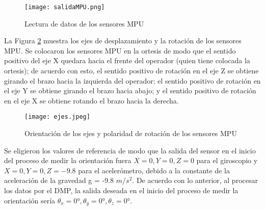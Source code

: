 \begin{figure}[htb]
	\centering
	\texttt{[image: salidaMPU.png]}
	\caption{Lectura de datos de los sensores MPU}
	\label{fig:salidaMPU}
\end{figure}



\newpage
La Figura \ref{fig:ejes} muestra los ejes de desplazamiento y la rotación de los sensores MPU. Se colocaron los sensores MPU en la ortesis de modo que el sentido positivo del eje X quedara hacia el frente del operador (quien tiene colocada la ortesis); de acuerdo con esto, el sentido positivo de rotación en el eje Z se obtiene girando el brazo hacia la izquierda del operador; el sentido positivo de rotación en el eje Y se obtiene girando el brazo hacia abajo; y el sentido positivo de rotación en el eje X se obtiene rotando el brazo hacia la derecha.

\begin{figure}[htb]
	\centering
	\texttt{[image: ejes.jpeg]}
	\caption{Orientación de los ejes y polaridad de rotación de los sensores MPU}
	\label{fig:ejes}
\end{figure}

Se eligieron los valores de referencia de modo que la salida del sensor en el inicio del proceso de medir la orientación fuera $X=0, Y=0, Z=0$ para el giroscopio y $X=0, Y=0, Z=-9.8$ para el acelerómetro, debido a la constante de la aceleración de la gravedad g = -9.8  $m/s^2$. De acuerdo con lo anterior, al procesar los datos por el DMP, la salida deseada en el inicio del proceso de medir la orientación sería $\theta_x = 0°,\theta_y = 0°,\theta_z = 0°$.


